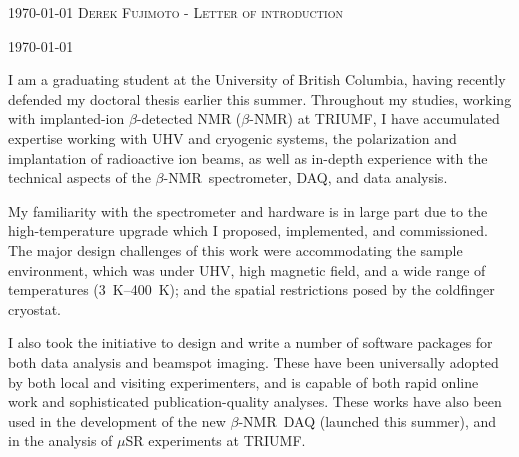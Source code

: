 \documentclass{simplehipstercv_cl}
\newcommand{\bnmr}{$\beta$-NMR}
\begin{document}
	\makecvheader

	\makecvfooter
		{\textsc{ \today}}
				{%
		}{\textsc{Derek Fujimoto - Letter of introduction}}

\vspace{0.75cm}

\color{accentcolor}
\today \par \vspace{-0.1cm}
\vspace{0.5cm}


I am a graduating student at the University of British Columbia, having recently defended my doctoral thesis earlier this summer. Throughout my studies, working with implanted-ion $\beta$-detected NMR (\bnmr) at TRIUMF, I have accumulated expertise working with UHV and cryogenic systems, the polarization and implantation of radioactive ion beams, as well as in-depth experience with the technical aspects of the \bnmr\ spectrometer, DAQ, and data analysis.

My familiarity with the spectrometer and hardware is in large part due to the high-temperature upgrade which I proposed, implemented, and commissioned. The major design challenges of this work were accommodating the sample environment, which was under UHV, high magnetic field, and a wide range of temperatures (\SIrange{3}{400}{\K}); and the spatial restrictions posed by the coldfinger cryostat.

I also took the initiative to design and write a number of software packages for both data analysis and beamspot imaging. These have been universally adopted by both local and visiting experimenters, and is capable of both rapid online work and sophisticated publication-quality analyses. These works have also been used in the development of the new \bnmr\ DAQ (launched this summer), and in the analysis of $\mu$SR experiments at TRIUMF.
\end{document}
